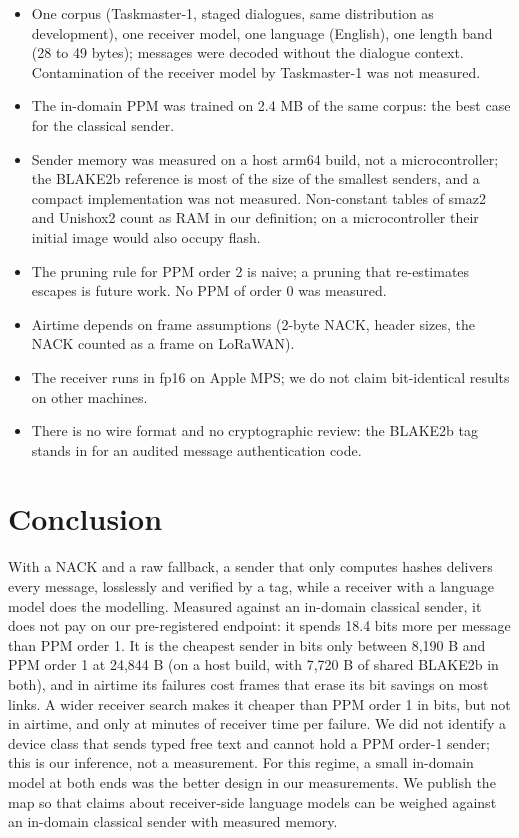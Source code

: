 \documentclass[11pt]{article}
\begin{document}
\begin{itemize}
\item One corpus (Taskmaster-1, staged dialogues, same distribution as development), one receiver
model, one language (English), one length band (28 to 49 bytes); messages were decoded without the
dialogue context. Contamination of the receiver model by Taskmaster-1 was not measured.
\item The in-domain PPM was trained on 2.4 MB of the same corpus: the best case for the classical
sender.
\item Sender memory was measured on a host arm64 build, not a microcontroller; the BLAKE2b reference
is most of the size of the smallest senders, and a compact implementation was not measured. Non-constant tables of smaz2
and Unishox2 count as RAM in our definition; on a microcontroller their initial image would also
occupy flash.
\item The pruning rule for PPM order 2 is naive; a pruning that re-estimates escapes is future work.
No PPM of order 0 was measured.
\item Airtime depends on frame assumptions (2-byte NACK, header sizes, the NACK counted as a frame on
LoRaWAN).
\item The receiver runs in fp16 on Apple MPS; we do not claim bit-identical results on other machines.
\item There is no wire format and no cryptographic review: the BLAKE2b tag stands in for an audited
message authentication code.
\end{itemize}

\section{Conclusion}

With a NACK and a raw fallback, a sender that only computes hashes delivers every message, losslessly
and verified by a tag, while a receiver with a language model does the modelling. Measured against an
in-domain classical sender, it does not pay on our pre-registered endpoint: it spends 18.4 bits more
per message than PPM order 1. It is the cheapest sender in bits only between 8,190 B and PPM order 1 at
24,844 B (on a host build, with 7,720 B of shared BLAKE2b in both), and in airtime its failures cost frames that
erase its bit savings on most links. A wider receiver search makes it cheaper than PPM order 1 in bits,
but not in airtime, and only at minutes of receiver time per failure. We did not identify a device
class that sends typed free text and cannot hold a PPM order-1 sender; this is our inference, not a
measurement. For this regime, a small in-domain model at both ends was the better design in our
measurements. We publish the map so that claims about receiver-side language models can be weighed
against an in-domain classical sender with measured memory.
\end{document}
